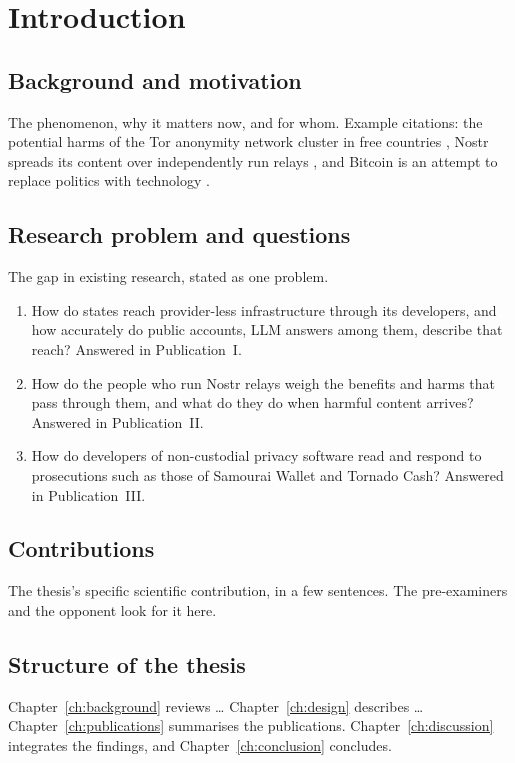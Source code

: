 \chapter{Introduction}\label{ch:introduction}

\section{Background and motivation}

The phenomenon, why it matters now, and for whom. Example citations: the
potential harms of the Tor anonymity network cluster in free countries
\parencite{jardine2020potential}, Nostr spreads its content over independently
run relays \parencite{wei2025empirical}, and Bitcoin is an attempt to replace
politics with technology \parencite[ch.~8]{lehdonvirta2022cloud}.

\section{Research problem and questions}

The gap in existing research, stated as one problem.

\begin{enumerate}[label=\textsf{\textbf{RQ\arabic*}}, leftmargin=4em, align=left]
  \item How do states reach provider-less infrastructure through its
    developers, and how accurately do public accounts, LLM answers among
    them, describe that reach? Answered in Publication~I.\label{rq:1}
  \item How do the people who run Nostr relays weigh the benefits and harms
    that pass through them, and what do they do when harmful content arrives?
    Answered in Publication~II.\label{rq:2}
  \item How do developers of non-custodial privacy software read and respond
    to prosecutions such as those of Samourai Wallet and Tornado Cash?
    Answered in Publication~III.\label{rq:3}
\end{enumerate}

\section{Contributions}

The thesis's specific scientific contribution, in a few sentences. The
pre-examiners and the opponent look for it here.

\section{Structure of the thesis}

Chapter~\ref{ch:background} reviews \ldots{} Chapter~\ref{ch:design} describes
\ldots{} Chapter~\ref{ch:publications} summarises the publications.
Chapter~\ref{ch:discussion} integrates the findings, and
Chapter~\ref{ch:conclusion} concludes.
